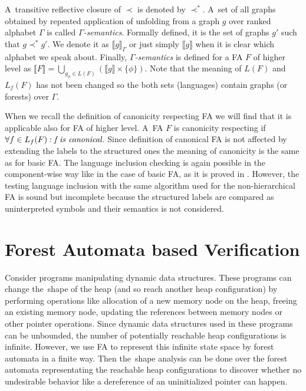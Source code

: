 A~transitive reflective closure of $\prec$ is denoted by $\prec^*$.
A~set of all graphs obtained by repeated application of unfolding from
a graph $g$ over ranked alphabet $\Gamma$ is called \emph{$\Gamma$-semantics}. 
Formally defined, it is the set of graphs $g'$ such that $g \prec^* g'$.
We denote it as $\llbracket g \rrbracket_\Gamma$ or just simply $\llbracket g \rrbracket$ when it is
clear which alphabet we speak about.
Finally, \emph{$\Gamma$-semantics} is defined for a FA $F$ of higher level as
$\llbracket F \rrbracket = \bigcup_{g_\phi \in L(F)} (\llbracket g \rrbracket \times \{\phi\})$.
Note that the meaning of $L(F)$ and $L_f(F)$ has not been changed
so the both sets (languages) contain graphs (or forests) over $\Gamma$.

When we recall the definition of canonicity respecting FA we will find that it is applicable also for FA of higher level.
A~FA $F$ is canonicity respecting if $\forall f \in L_f(F): \emph{f is canonical}$.
Since definition of canonical FA is not affected by extending the labels to the structured ones the meaning of canonicity is the same as for basic FA.
The language inclusion checking is again possible in the component-wise way like in the case of basic FA, as it is
proved in \cite{forester:techrep}.
However, the testing language inclusion with the same algorithm used for the non-hierarchical FA
is sound but incomplete because the structured labels are compared as uninterpreted symbols and their semantics
is not considered.


\chapter{Forest Automata based Verification}
\label{ch:fav}

Consider programs manipulating dynamic data structures.
These programs can change the~shape of the heap (and so reach another heap configuration)
by performing operations like allocation of a new memory node on the heap,
freeing an existing memory node, updating the references between memory nodes
or other pointer operations.
Since dynamic data structures used in these programs can be
unbounded, the number of potentially reachable heap configurations is infinite.
However, we use FA to represent this infinite state space by forest automata in a finite way.
Then the~shape analysis can be done over the forest automata representating the reachable
heap configurations to discover whether no undesirable behavior
like a dereference of an uninitialized pointer can happen.


